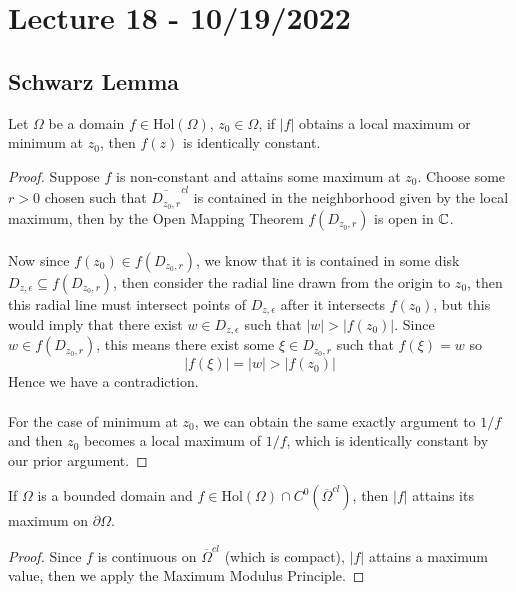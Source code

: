 \section{Lecture 18 - 10/19/2022}

\subsection{Schwarz Lemma}

\begin{lemma}
    Let $\Omega$ be a domain $f \in \text{Hol}(\Omega)$, $z_0 \in \Omega$, if $|f|$ obtains a local maximum or minimum at $z_0$, then $f(z)$ is identically constant.
\end{lemma}

\begin{proof}
    Suppose $f$ is non-constant and attains some maximum at $z_0$. Choose some $r > 0$ chosen such that $\overline{D_{z_0, r}}^{cl}$ is contained in the neighborhood given by the local maximum, then by the Open Mapping Theorem $f(D_{z_0, r})$ is open in $\mathbb{C}$.\\\\
    Now since $f(z_0) \in f(D_{z_0, r})$, we know that it is contained in some disk $D_{z, \epsilon} \subseteq f(D_{z_0, r})$, then consider the radial line drawn from the origin to $z_0$, then this radial line must intersect points of $D_{z, \epsilon}$ after it intersects $f(z_0)$, but this would imply that there exist $w \in D_{z, \epsilon}$ such that $|w| > |f(z_0)|$. Since $w \in f(D_{z_0, r})$, this means there exist some $\xi \in D_{z_0, r}$ such that $f(\xi) = w$ so
    \[|f(\xi)| = |w| > |f(z_0)|\]
    Hence we have a contradiction.\\\\
    For the case of minimum at $z_0$, we can obtain the same exactly argument to $1/f$ and then $z_0$ becomes a local maximum of $1/f$, which is identically constant by our prior argument.
\end{proof}

\begin{corollary}
    If $\Omega$ is a bounded domain and $f \in \text{Hol}(\Omega) \cap C^0(\overline{\Omega}^{cl})$, then $|f|$ attains its maximum on $\partial \Omega$.
\end{corollary}

\begin{proof}
    Since $f$ is continuous on $\overline{\Omega}^{cl}$ (which is compact), $|f|$ attains a maximum value, then we apply the Maximum Modulus Principle.
\end{proof}

